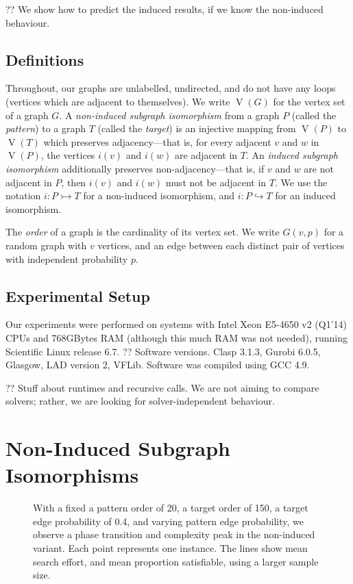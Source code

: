\documentclass[letterpaper]{article}
\begin{document}
?? We show how to predict the induced results, if we know the non-induced behaviour.

\subsection{Definitions}

Throughout, our graphs are unlabelled, undirected, and do not have any loops (vertices which are
adjacent to themselves). We write $\operatorname{V}(G)$ for the vertex set of a graph $G$. A
\emph{non-induced subgraph isomorphism} from a graph $P$ (called the \emph{pattern}) to a graph $T$
(called the \emph{target}) is an injective mapping from $\operatorname{V}(P)$ to
$\operatorname{V}(T)$ which preserves adjacency---that is, for every adjacent $v$ and $w$ in
$\operatorname{V}(P)$, the vertices $i(v)$ and $i(w)$ are adjacent in $T$. An \emph{induced subgraph
isomorphism} additionally preserves non-adjacency---that is, if $v$ and $w$ are not adjacent in $P$,
then $i(v)$ and $i(w)$ must not be adjacent in $T$. We use the notation $i : P \rightarrowtail T$
for a non-induced isomorphism, and $i : P \hookrightarrow T$ for an induced isomorphism.

The \emph{order} of a graph is the cardinality of its vertex set.  We write $G(v, p)$ for a random
graph with $v$ vertices, and an edge between each distinct pair of vertices with independent
probability $p$.

\subsection{Experimental Setup}

Our experiments were performed on systems with Intel Xeon E5-4650 v2 (Q1'14) CPUs and 768GBytes RAM
(although this much RAM was not needed), running Scientific Linux release 6.7.   ?? Software
versions. Clasp 3.1.3, Gurobi 6.0.5, Glasgow, LAD version 2, VFLib. Software was compiled using GCC
4.9.

?? Stuff about runtimes and recursive calls. We are not aiming to compare solvers; rather, we are
looking for solver-independent behaviour.

\section{Non-Induced Subgraph Isomorphisms}

\begin{figure}[t]
    
    \caption{With a fixed a pattern order of 20, a target order of 150, a target edge probability of 0.4, and
    varying pattern edge probability, we observe a phase transition and complexity peak in the non-induced
    variant. Each point represents one instance. The lines show mean search effort, and mean
    proportion satisfiable, using a larger sample size.}
    \label{figure:phase-transition}
\end{figure}
\end{document}
